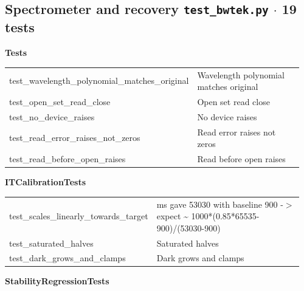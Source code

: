 \subsection{Spectrometer and recovery \hfill \normalfont\small\color{soft2}\texttt{test\_bwtek.py} $\cdot$ 19 tests}
\par\smallskip \textbf{Tests}\par\nopagebreak\smallskip
\begin{longtable}{@{}>{\ttfamily\scriptsize\raggedright\arraybackslash}p{0.40\linewidth} >{\footnotesize\raggedright\arraybackslash}p{0.555\linewidth}@{}}
test\_\allowbreak{}wavelength\_\allowbreak{}polynomial\_\allowbreak{}matches\_\allowbreak{}original & Wavelength polynomial matches original \\
test\_\allowbreak{}open\_\allowbreak{}set\_\allowbreak{}read\_\allowbreak{}close & Open set read close \\
test\_\allowbreak{}no\_\allowbreak{}device\_\allowbreak{}raises & No device raises \\
test\_\allowbreak{}read\_\allowbreak{}error\_\allowbreak{}raises\_\allowbreak{}not\_\allowbreak{}zeros & Read error raises not zeros \\
test\_\allowbreak{}read\_\allowbreak{}before\_\allowbreak{}open\_\allowbreak{}raises & Read before open raises \\
\end{longtable}
\par\smallskip \textbf{ITCalibrationTests}\par\nopagebreak\smallskip
\begin{longtable}{@{}>{\ttfamily\scriptsize\raggedright\arraybackslash}p{0.40\linewidth} >{\footnotesize\raggedright\arraybackslash}p{0.555\linewidth}@{}}
test\_\allowbreak{}scales\_\allowbreak{}linearly\_\allowbreak{}towards\_\allowbreak{}target & 1000 ms gave 53030 with baseline 900 -$>$ expect \textasciitilde{} 1000*(0.85*65535-900)/(53030-900) \\
test\_\allowbreak{}saturated\_\allowbreak{}halves & Saturated halves \\
test\_\allowbreak{}dark\_\allowbreak{}grows\_\allowbreak{}and\_\allowbreak{}clamps & Dark grows and clamps \\
\end{longtable}
\par\smallskip \textbf{StabilityRegressionTests}\par\nopagebreak\smallskip
